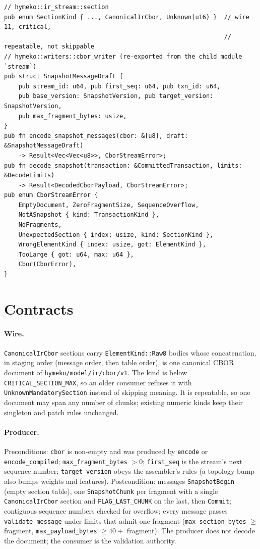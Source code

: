 \documentclass[11pt,a4paper]{article}
\begin{document}
\begin{small}
\begin{verbatim}
// hymeko::ir_stream::section
pub enum SectionKind { ..., CanonicalIrCbor, Unknown(u16) }  // wire 11, critical,
                                                             // repeatable, not skippable
// hymeko::writers::cbor_writer (re-exported from the child module `stream`)
pub struct SnapshotMessageDraft {
    pub stream_id: u64, pub first_seq: u64, pub txn_id: u64,
    pub base_version: SnapshotVersion, pub target_version: SnapshotVersion,
    pub max_fragment_bytes: usize,
}
pub fn encode_snapshot_messages(cbor: &[u8], draft: &SnapshotMessageDraft)
    -> Result<Vec<Vec<u8>>, CborStreamError>;
pub fn decode_snapshot(transaction: &CommittedTransaction, limits: &DecodeLimits)
    -> Result<DecodedCborPayload, CborStreamError>;
pub enum CborStreamError {
    EmptyDocument, ZeroFragmentSize, SequenceOverflow,
    NotASnapshot { kind: TransactionKind },
    NoFragments,
    UnexpectedSection { index: usize, kind: SectionKind },
    WrongElementKind { index: usize, got: ElementKind },
    TooLarge { got: u64, max: u64 },
    Cbor(CborError),
}
\end{verbatim}
\end{small}

\section{Contracts}

\paragraph{Wire.} \texttt{CanonicalIrCbor} sections carry \texttt{ElementKind::Raw8} bodies whose concatenation, in
staging order (message order, then table order), is one canonical CBOR document of
\texttt{hymeko/model/ir/cbor/v1}. The kind is below \texttt{CRITICAL\_SECTION\_MAX}, so an older consumer refuses it
with \texttt{UnknownMandatorySection} instead of skipping meaning. It is repeatable, so one document may span any
number of chunks; existing numeric kinds keep their singleton and patch rules unchanged.

\paragraph{Producer.} Preconditions: \texttt{cbor} is non-empty and was produced by \texttt{encode} or
\texttt{encode\_compiled}; \texttt{max\_fragment\_bytes} $> 0$; \texttt{first\_seq} is the stream's next sequence
number; \texttt{target\_version} obeys the assembler's rules (a topology bump also bumps weights and features).
Postcondition: messages \texttt{SnapshotBegin} (empty section table), one \texttt{SnapshotChunk} per fragment with a
single \texttt{CanonicalIrCbor} section and \texttt{FLAG\_LAST\_CHUNK} on the last, then \texttt{Commit}; contiguous
sequence numbers checked for overflow; every message passes \texttt{validate\_message} under limits that admit one
fragment (\texttt{max\_section\_bytes} $\ge$ fragment, \texttt{max\_payload\_bytes} $\ge 40 +$ fragment). The producer
does not decode the document; the consumer is the validation authority.
\end{document}
